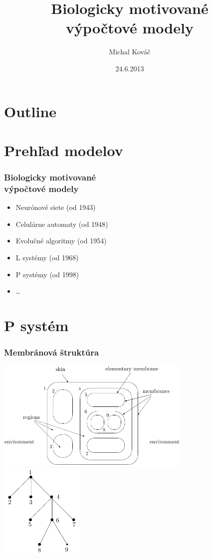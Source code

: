 \documentclass{beamer}
\title{Biologicky motivované\\výpočtové modely}
\author{Michal Kováč}
\institute{FMFI UK}
\date{24.6.2013}
\begin{document}
\begin{frame}[t]
\titlepage
\end{frame}

\section*{Outline}
\begin{frame}
\tableofcontents
\end{frame}

\section{Prehľad modelov} %
\label{sec:prehlad_modelov}

\begin{frame}[t]\frametitle{Biologicky motivované\\výpočtové modely}
\begin{itemize}
  \item Neurónové siete (od 1943)
  \item Celulárne automaty (od 1948)
  \item Evolučné algoritmy (od 1954)
  \item L systémy (od 1968)
  \item P systémy (od 1998)
  \item \dots

\end{itemize}
\end{frame}


\section{P systém} %
\label{sec:membranov_systemy}


\begin{frame}[t]\frametitle{Membránová štruktúra}
\includegraphics[width=0.7\textwidth]{membrane_structure.png}
\hfill
\includegraphics[width=0.3\textwidth]{membrane_tree.png}
\end{frame}
\end{document}
